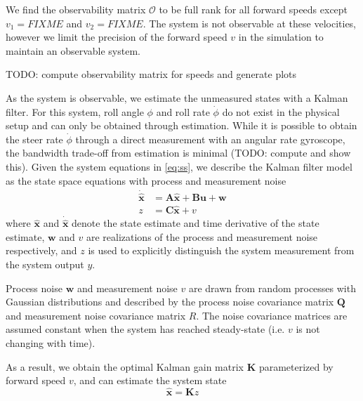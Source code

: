 \documentclass[11pt,a4paper,reqno]{amsart}
\newcommand{\sysInput}{\bm{u}}
\newcommand{\sysOutput}{y}
\newcommand{\stateMat}{\bm{A}}
\newcommand{\inputMat}{\bm{B}}
\newcommand{\outputMat}{\bm{C}}
\newcommand{\dstateEst}{\dot{\hat{\bm{x}}}}
\newcommand{\stateEst}{\hat{\bm{x}}}
\newcommand{\meas}{z}
\newcommand{\processCov}{\bm{Q}}
\newcommand{\processNoise}{\bm{w}}
\newcommand{\measCov}{R}
\newcommand{\measNoise}{v}
\newcommand{\kalmanGain}{\bm{K}}
\newcommand{\estimateCov}{\bm{P}}
\newcommand{\roll}{\phi}
\newcommand{\rollRate}{\dot{\phi}}
\newcommand{\steerRate}{\dot{\phi}}
\begin{document}
We find the observability matrix $ \bm{\mathcal{O}} $ to be full rank for all forward speeds except
$ v_1 = FIXME $ and $ v_2 = FIXME $.
The system is not observable at these velocities, however we limit the precision of the forward speed $ v $ in the
simulation to maintain an observable system.

TODO: compute observability matrix for speeds and generate plots


As the system is observable, we estimate the unmeasured states with a Kalman filter.
For this system, roll angle $ \roll $ and roll rate $ \rollRate $ do not exist in the physical setup and can only be
obtained through estimation.
While it is possible to obtain the steer rate $ \steerRate $ through a direct measurement with an angular rate
gyroscope, the bandwidth trade-off from estimation is minimal (TODO: compute and show this).
Given the system equations in \autoref{eq:ss}, we describe the Kalman filter model as the state space equations with
process and measurement noise
\begin{equation}
\begin{aligned}
    \dstateEst &= \stateMat \stateEst + \inputMat \sysInput + \processNoise \\
    \meas &= \outputMat \stateEst + \measNoise \label{eq:kalman_ss}
\end{aligned}
\end{equation}
where $ \stateEst $ and $ \dstateEst $ denote the state estimate and time derivative of the state estimate,
$ \processNoise $ and $ \measNoise $ are realizations of the process and measurement noise respectively,
and $ \meas $ is used to explicitly distinguish the system measurement from the system output $ \sysOutput $.

Process noise $ \processNoise $ and measurement noise $ \measNoise $ are drawn from random processes with
Gaussian distributions and described by the
process noise covariance matrix $ \processCov $ and measurement noise covariance matrix $ \measCov $.
The noise covariance matrices are assumed constant when the system has reached steady-state
(i.e. $ v $ is not changing with time). %

As a result, we obtain the optimal Kalman gain matrix $ \kalmanGain $
parameterized by forward speed $ v $, and can estimate the system state
\begin{equation}
    \stateEst = \kalmanGain \meas
\end{equation}
\end{document}
